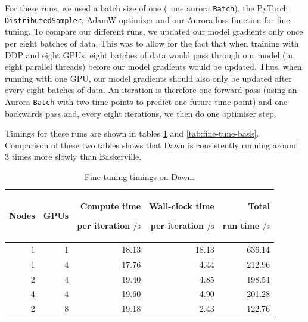 For these runs, we used a batch size of one (\ie\ one aurora \texttt{Batch}), the PyTorch {\tt DistributedSampler}, AdamW optimizer and our Aurora loss function for fine-tuning. To compare our different runs, we updated our model gradients only once per eight batches of data. This was to allow for the fact that when training with DDP and eight GPUs, eight batches of data would pass through our model (in eight parallel threads) before our model gradients would be updated. Thus, when running with one GPU, our model gradients should also only be updated after every eight batches of data. An iteration is therefore one forward pass (using an Aurora \texttt{Batch} with two time points to predict one future time point) and one backwards pass and, every eight iterations, we then do one optimiser step.

Timings for these runs are shown in tables \ref{tab:fine-tune-Dawn} and \ref{tab:fine-tune-bask}. Comparison of these two tables shows that Dawn is consistently running around 3 times more slowly than Baskerville.

\begin{table}[t] %
    \centering
    \begin{tabular}{@{}rrrrr@{}}
      \toprule
      Nodes
      & GPUs
      & \shortstack[r]{Compute time\strut \\ per iteration ${}/\unit{\second}$}
      & \shortstack[r]{Wall-clock time\strut \\ per iteration ${}/\unit{\second}$}
      & \shortstack[r]{Total\strut \\ run time ${}/\unit{\second}$} \\ \midrule
        1 & 1 & 18.13& 18.13& 636.14\\
        1 & 4 & 17.76& 4.44& 212.96\\
        2 & 4 & 19.40& 4.85& 198.54\\
        4 & 4 & 19.60& 4.90& 201.28\\
        2 & 8 & 19.18& 2.43& 122.76\\ \bottomrule
    \end{tabular}
    \caption{Fine-tuning timings on Dawn.}
    \label{tab:fine-tune-Dawn}
\end{table}

